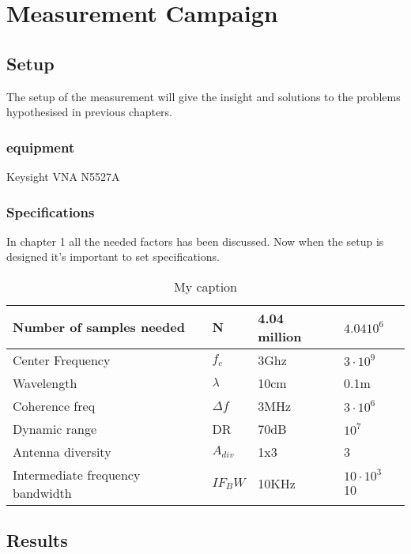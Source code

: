 \chapter{Measurement Campaign}
\section{Setup}
The setup of the measurement will give the insight and solutions to the problems hypothesised in previous chapters. 
\subsection{equipment}
Keysight \gls{VNA} N5527A
\subsection{Specifications}
In chapter 1 all the needed factors has been discussed. Now when the setup is designed it's important to set specifications.
\begin{table}[]
\centering
\caption{My caption}
\label{final_specs}
\begin{tabular}{|l|l|l|l|}
\hline
Number of samples needed         & N           & 4.04 million   & $4.04 10^6$        \\ \hline
Center Frequency                 & $f_c$       & 3Ghz           & $3 \cdot 10^9$     \\ \hline
Wavelength                       & $\lambda$   & 10cm           & 0.1m               \\ \hline
Coherence freq                   & $\Delta f$  & 3MHz           & $3 \cdot 10^6$     \\ \hline
Dynamic range                    & DR          & 70dB           & $10^7$             \\ \hline
Antenna diversity                & $A_{div}$   & 1x3            & 3                  \\ \hline
Intermediate frequency bandwidth & $IF_BW$     & 10KHz          & $10 \cdot 10^3$ 10 \\ \hline
\end{tabular}
\end{table}
\section{Results}